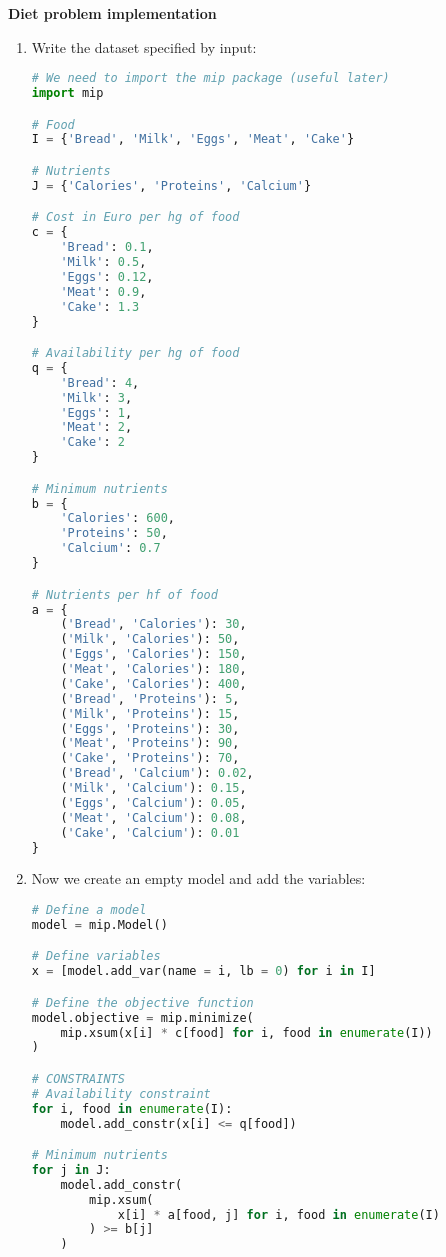 \highspace
\begin{flushleft}
    \textcolor{Green3}{ \textbf{Diet problem implementation}}
\end{flushleft}

\begin{enumerate}
    \item Write the dataset specified by input:
    \begin{lstlisting}[language=Python]
# We need to import the mip package (useful later)
import mip

# Food
I = {'Bread', 'Milk', 'Eggs', 'Meat', 'Cake'}

# Nutrients
J = {'Calories', 'Proteins', 'Calcium'}

# Cost in Euro per hg of food
c = {
    'Bread': 0.1, 
    'Milk': 0.5, 
    'Eggs': 0.12,
    'Meat': 0.9,
    'Cake': 1.3
}

# Availability per hg of food
q = {
    'Bread': 4,
    'Milk': 3,
    'Eggs': 1,
    'Meat': 2,
    'Cake': 2
}

# Minimum nutrients 
b = {
    'Calories': 600,
    'Proteins': 50,
    'Calcium': 0.7
}

# Nutrients per hf of food
a = {
    ('Bread', 'Calories'): 30,
    ('Milk', 'Calories'): 50,
    ('Eggs', 'Calories'): 150,
    ('Meat', 'Calories'): 180,
    ('Cake', 'Calories'): 400,
    ('Bread', 'Proteins'): 5,
    ('Milk', 'Proteins'): 15,
    ('Eggs', 'Proteins'): 30,
    ('Meat', 'Proteins'): 90,
    ('Cake', 'Proteins'): 70,
    ('Bread', 'Calcium'): 0.02,
    ('Milk', 'Calcium'): 0.15,
    ('Eggs', 'Calcium'): 0.05,
    ('Meat', 'Calcium'): 0.08,
    ('Cake', 'Calcium'): 0.01
}\end{lstlisting}

    \item Now we create an empty model and add the variables:
    \begin{lstlisting}[language=Python]
# Define a model
model = mip.Model()

# Define variables
x = [model.add_var(name = i, lb = 0) for i in I]

# Define the objective function
model.objective = mip.minimize(
    mip.xsum(x[i] * c[food] for i, food in enumerate(I))
)

# CONSTRAINTS
# Availability constraint
for i, food in enumerate(I):
    model.add_constr(x[i] <= q[food])

# Minimum nutrients
for j in J:
    model.add_constr(
        mip.xsum(
            x[i] * a[food, j] for i, food in enumerate(I)
        ) >= b[j]
    )\end{lstlisting}


\end{enumerate}
